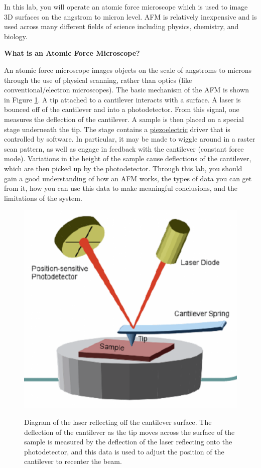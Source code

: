 \documentclass{../lab}
\begin{document}
In this lab, you will operate an atomic force microscope which is used to image 3D surfaces on the angstrom to micron level. AFM is relatively inexpensive and is used across many different fields of science including physics, chemistry, and biology.

\textbf{What is an Atomic Force Microscope?}

An atomic force microscope images objects on the scale of angstroms to microns through the use of physical scanning, rather than optics (like conventional/electron microscopes). The basic mechanism of the AFM is shown in Figure \ref{fig:BasicMechanism}. A tip attached to a cantilever interacts with a surface. A laser is bounced off of the cantilever and into a photodetector. From this signal, one measures the deflection of the cantilever. A sample is then placed on a special stage underneath the tip. The stage contains a \hyperref[subsubsec:Piezo]{piezoelectric} driver that is controlled by software. In particular, it may be made to wiggle around in a raster scan pattern, as well as engage in feedback with the cantilever (constant force mode). Variations in the height of the sample cause deflections of the cantilever, which are then picked up by the photodetector. Through this lab, you should gain a good understanding of how an AFM works, the types of data you can get from it, how you can use this data to make meaningful conclusions, and the limitations of the system.

\begin{figure}[h]
    \centering
    \begin{minipage}{0.75\linewidth}
    \centering
    \href{http://experimentationlab.berkeley.edu/sites/default/files/AFMImages/2_0.png}{\includegraphics[width=0.66\linewidth]{images/2_0.png}}
    \caption{Diagram of the laser reflecting off the cantilever surface. The deflection of the cantilever as the tip moves across the surface of the sample is measured by the deflection of the laser reflecting onto the photodetector, and this data is used to adjust the position of the cantilever to recenter the beam.}
    \label{fig:BasicMechanism}
    \end{minipage}
\end{figure}
\end{document}
